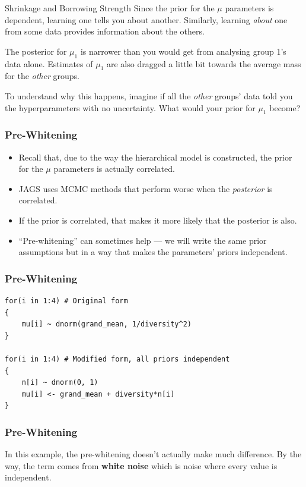 \documentclass{beamer}
\begin{document}
\begin{frame}[fragile]{Shrinkage and Borrowing Strength}
Since the prior for the $\mu$ parameters is dependent, learning one
tells you about another. Similarly, learning {\em about} one from some data
provides information about the others.\pause

The posterior for
$\mu_1$ is narrower than you would get from analysing group 1's data alone.
Estimates of $\mu_1$ are also dragged a little bit towards the average mass
for the {\em other} groups.
\pause

To understand why this happens, imagine if all the {\em other} groups' data
told you the hyperparameters with no uncertainty. What would your
prior for $\mu_1$ become?
\end{frame}


\begin{frame}[fragile]
\frametitle{Pre-Whitening}

\begin{itemize}
\item Recall that, due to the way the hierarchical model is constructed,
the prior for the $\mu$ parameters is actually correlated.\pause
\item JAGS uses MCMC methods that perform worse when the {\em posterior}
is correlated.\pause
\item If the prior is correlated, that makes it more likely that the posterior
is also.\pause
\item ``Pre-whitening'' can sometimes help --- we will write the same prior
assumptions but in a way that makes the parameters' priors independent.
\end{itemize}


\end{frame}

\begin{frame}[fragile]
\frametitle{Pre-Whitening}
\begin{verbatim}
for(i in 1:4) # Original form
{
    mu[i] ~ dnorm(grand_mean, 1/diversity^2)
}

for(i in 1:4) # Modified form, all priors independent
{
    n[i] ~ dnorm(0, 1)
    mu[i] <- grand_mean + diversity*n[i]
}
\end{verbatim}

\end{frame}


\begin{frame}[fragile]
\frametitle{Pre-Whitening}
In this example, the pre-whitening doesn't actually make much difference.
By the way, the term comes from {\bf white noise} which is noise where
every value is independent.
\end{frame}
\end{document}
